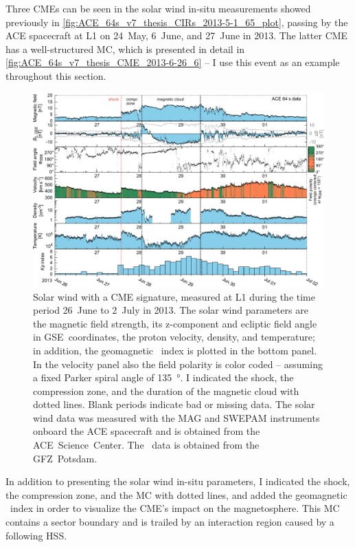Three CMEs can be seen in the solar wind in-situ measurements showed previously in \autoref{fig:ACE_64s_v7_thesis_CIRs_2013-5-1_65_plot}, passing by the ACE spacecraft at L1 on 24~May, 6~June, and 27~June in 2013. The latter CME has a well-structured MC, which is presented in detail in \autoref{fig:ACE_64s_v7_thesis_CME_2013-6-26_6} -- I use this event as an example throughout this section.
\begin{figure}[htb]
	\centering
	\includegraphics[width=\textwidth]{figures_of_mine/gnuplots/ACE_64s_v7_thesis_CME_2013-6-26_6.pdf}
	\caption[]
	{Solar wind with a CME signature, measured at L1 during the time period 26~June to 2~July in 2013. The solar wind parameters are the magnetic field strength, its z-component and ecliptic field angle in GSE~coordinates, the proton velocity, density, and temperature; in addition, the geomagnetic \Kp~index is plotted in the bottom panel. In the velocity panel also the field polarity is color coded -- assuming a fixed Parker spiral angle of \SI{135}{\degree}. I indicated the shock, the compression zone, and the duration of the magnetic cloud with dotted lines. Blank periods indicate bad or missing data. The solar wind data was measured with the MAG and SWEPAM instruments onboard the ACE spacecraft and is obtained from the ACE~Science~Center. The \Kp{}~data is obtained from the GFZ~Potsdam.}
	\label{fig:ACE_64s_v7_thesis_CME_2013-6-26_6}
\end{figure}
In addition to presenting the solar wind in-situ parameters, I indicated the shock, the compression zone, and the MC with dotted lines, and added the geomagnetic \Kp{}~index in order to visualize the CME's impact on the magnetosphere. This MC contains a sector boundary and is trailed by an interaction region caused by a following HSS.

